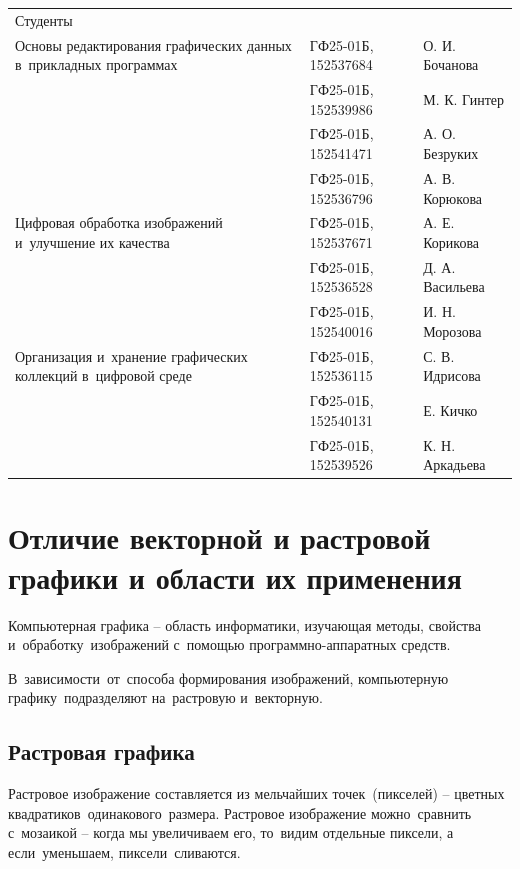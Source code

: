 \documentclass{ou}
\begin{document}
\begin{flushleft}
\doublespacing
\begin{tabularx}{\textwidth}{@{} p{} l l @{}}
Студенты     &                     &         \\
\multirow{-2.27}{\hsize}{\singlespacing Основы редактирования графических данных в~прикладных программах}
             & ГФ25-01Б, 152537684 & О. И. Бочанова\\
             & ГФ25-01Б, 152539986 & М. К. Гинтер\\
             & ГФ25-01Б, 152541471 & А. О. Безруких\\
             & ГФ25-01Б, 152536796 & А. В. Корюкова\\
\multirow{-2.27}{\hsize}{\singlespacing Цифровая обработка изображений и~улучшение их качества}
             & ГФ25-01Б, 152537671 & А. Е. Корикова\\
             & ГФ25-01Б, 152536528 & Д. А. Васильева\\
             & ГФ25-01Б, 152540016 & И. Н. Морозова\\
\multirow{-2.27}{\hsize}{\singlespacing Организация и~хранение графических коллекций в~цифровой среде}
             & ГФ25-01Б, 152536115 & С. В. Идрисова\\
             & ГФ25-01Б, 152540131 & Е. Кичко\\
             & ГФ25-01Б, 152539526 & К. Н. Аркадьева\\
\end{tabularx}
\end{flushleft}
\newpage
\tableofcontents
\newpage
\onehalfspacing
\section{Отличие векторной и растровой графики и области их применения}
Компьютерная графика -- область информатики, изучающая методы, свойства и~обработку~изображений с~помощью программно-аппаратных средств.

В~зависимости~от~способа формирования изображений, компьютерную графику~подразделяют на~растровую и~векторную.
 \subsection{Растровая графика}
Растровое изображение составляется из мельчайших точек~(пикселей) -- цветных квадратиков~одинакового~размера. Растровое изображение можно~сравнить с~мозаикой -- когда мы увеличиваем его, то~видим отдельные пиксели, а если~уменьшаем, пиксели~сливаются.
\end{document}
